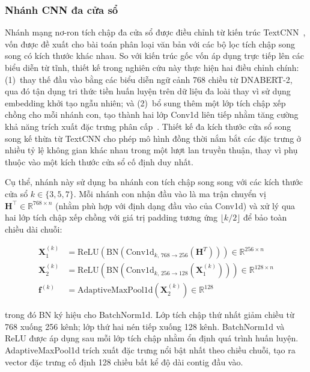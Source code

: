 \subsubsection{Nhánh CNN đa cửa sổ}

Nhánh mạng nơ-ron tích chập đa cửa sổ được điều chỉnh từ kiến trúc TextCNN~\cite{kim2014convolutional}, vốn được đề xuất cho bài toán phân loại văn bản với các bộ lọc tích chập song song có kích thước khác nhau. So với kiến trúc gốc vốn áp dụng trực tiếp lên các biểu diễn từ tĩnh, thiết kế trong nghiên cứu này thực hiện hai điều chỉnh chính: (1)~thay thế đầu vào bằng các biểu diễn ngữ cảnh 768 chiều từ DNABERT-2, qua đó tận dụng tri thức tiền huấn luyện trên dữ liệu đa loài thay vì sử dụng embedding khởi tạo ngẫu nhiên; và (2)~bổ sung thêm một lớp tích chập xếp chồng cho mỗi nhánh con, tạo thành hai lớp Conv1d liên tiếp nhằm tăng cường khả năng trích xuất đặc trưng phân cấp~\cite{johnson2017deep}. Thiết kế đa kích thước cửa sổ song song kế thừa từ TextCNN cho phép mô hình đồng thời nắm bắt các đặc trưng ở nhiều tỷ lệ không gian khác nhau trong một lượt lan truyền thuận, thay vì phụ thuộc vào một kích thước cửa sổ cố định duy nhất.

Cụ thể, nhánh này sử dụng ba nhánh con tích chập song song với các kích thước cửa sổ $k \in \{3, 5, 7\}$. Mỗi nhánh con nhận đầu vào là ma trận chuyển vị $\mathbf{H}^\top \in \mathbb{R}^{768 \times n}$ (nhằm phù hợp với định dạng đầu vào của Conv1d) và xử lý qua hai lớp tích chập xếp chồng với giá trị padding tương ứng $\lfloor k/2 \rfloor$ để bảo toàn chiều dài chuỗi:

\begin{align}
    \mathbf{X}^{(k)}_1 &= \text{ReLU}\!\left(\text{BN}\!\left(\text{Conv1d}_{k,\,768 \to 256}(\mathbf{H}^T)\right)\right) \in \mathbb{R}^{256 \times n} \label{eq:cnn_layer1} \\
    \mathbf{X}^{(k)}_2 &= \text{ReLU}\!\left(\text{BN}\!\left(\text{Conv1d}_{k,\,256 \to 128}(\mathbf{X}^{(k)}_1)\right)\right) \in \mathbb{R}^{128 \times n} \label{eq:cnn_layer2} \\
    \mathbf{f}^{(k)} &= \text{AdaptiveMaxPool1d}(\mathbf{X}^{(k)}_2) \in \mathbb{R}^{128} \label{eq:cnn_pool}
\end{align}

trong đó BN ký hiệu cho BatchNorm1d. Lớp tích chập thứ nhất giảm chiều từ 768 xuống 256 kênh; lớp thứ hai nén tiếp xuống 128 kênh. BatchNorm1d và ReLU được áp dụng sau mỗi lớp tích chập nhằm ổn định quá trình huấn luyện. AdaptiveMaxPool1d trích xuất đặc trưng nổi bật nhất theo chiều chuỗi, tạo ra vector đặc trưng cố định 128 chiều bất kể độ dài contig đầu vào.

